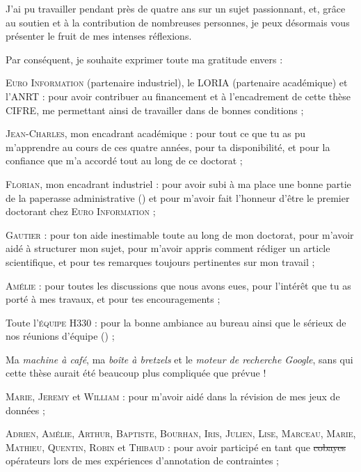 \begin{ThesisAcknowledgments}

	J'ai pu travailler pendant près de quatre ans sur un sujet passionnant, et, grâce au soutien et à la contribution de nombreuses personnes, je peux désormais vous présenter le fruit de mes intenses réflexions.
	
	Par conséquent, je souhaite exprimer toute ma gratitude envers :
	\begin{todolist}
		\item[\itemok] \textsc{Euro Information} (partenaire industriel), le \textsc{LORIA} (partenaire académique) et l'\textsc{ANRT} :
		pour avoir contribuer au financement et à l’encadrement de cette thèse CIFRE, me permettant ainsi de travailler dans de bonnes conditions ;
		\item[\itemok] \textsc{Jean-Charles}, mon encadrant académique :
		pour tout ce que tu as pu m'apprendre au cours de ces quatre années, pour ta disponibilité, et pour la confiance que m'a accordé tout au long de ce doctorat ;
		\item[\itemok] \textsc{Florian}, mon encadrant industriel :
		pour avoir subi à ma place une bonne partie de la paperasse administrative (\faGrinTongueWink) et pour m'avoir fait l'honneur d'être le premier doctorant chez \textsc{Euro Information} ;
		\item[\itemok] \textsc{Gautier} :
		pour ton aide inestimable toute au long de mon doctorat, pour m'avoir aidé à structurer mon sujet, pour m'avoir appris comment rédiger un article scientifique, et pour tes remarques toujours pertinentes sur mon travail ;
		\item[\itemok] \textsc{Amélie} : pour toutes les discussions que nous avons eues, pour l’intérêt que tu as porté à mes travaux, et pour tes encouragements ;
		\item[\itemok] Toute l'\textsc{équipe H330} : pour la bonne ambiance au bureau ainsi que le sérieux de nos réunions d'équipe (\faGrinTongueWink) ;
		\item[\itemok] Ma \textit{machine à café}, ma \textit{boîte à bretzels} et le \textit{moteur de recherche Google}, sans qui cette thèse aurait été beaucoup plus compliquée que prévue ! \faGrinBeamSweat
		\item[\itemok] \textsc{Marie}, \textsc{Jeremy} et \textsc{William} : pour m'avoir aidé dans la révision de mes jeux de données ;
		\item[\itemok] \textsc{Adrien}, \textsc{Amélie}, \textsc{Arthur}, \textsc{Baptiste}, \textsc{Bourhan}, \textsc{Iris}, \textsc{Julien}, \textsc{Lise}, \textsc{Marceau}, \textsc{Marie}, \textsc{Mathieu}, \textsc{Quentin}, \textsc{Robin} et \textsc{Thibaud} : pour avoir participé en tant que \st{cobayes} opérateurs lors de mes expériences d'annotation de contraintes ; 

\end{todolist}
\end{ThesisAcknowledgments}

